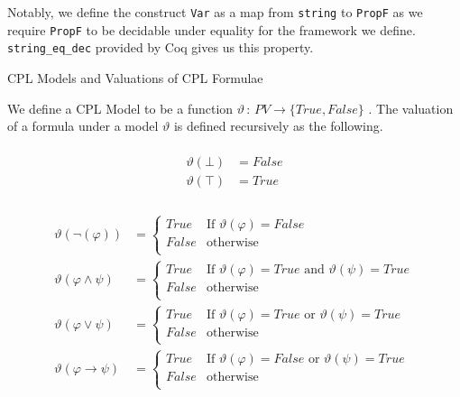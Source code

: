 \documentclass{llncs}
\begin{document}
Notably, we define the construct \verb+Var+ as a map from \verb+string+ to
\verb+PropF+ as we require \verb+PropF+ to be decidable under equality for the
framework we define. \verb+string_eq_dec+ provided by Coq gives us this
property.
%
\begin{definition}{CPL Models and Valuations of CPL Formulae}\label{CPL Model}

We define a CPL Model to be a function $\vartheta \, : \, PV \rightarrow
\{True, False\}$ \cite{kelly2009revised}. The valuation of a formula under a
model $\vartheta$ is defined recursively as the following.
%
\begin{figure}
\vspace{-2mm}
\begin{vwcol}[widths={0.25,0.75}, sep=0.5cm, justify=flush,rule=0pt,indent=1em]
\begin{align*}
\\
\vartheta (\bot) &= False \\
\vartheta (\top) &= True \\
\\
\\
\\
\end{align*}
\break
\begin{align*}
\vartheta (\neg(\varphi)) &=
\begin{cases}
True & \textrm{If } \vartheta(\varphi) = False \\
False & \textrm{otherwise} \\
\end{cases} \\
\vartheta (\varphi \wedge \psi) &=
\begin{cases}
True & \textrm{If } \vartheta(\varphi) = True \textrm{ and } \vartheta(\psi) =
True \\
False & \textrm{otherwise} \\
\end{cases} \\
\vartheta (\varphi \vee \psi) &=
\begin{cases}
True & \textrm{If } \vartheta(\varphi) = True \textrm{ or } \vartheta(\psi) =
True \\
False & \textrm{otherwise} \\
\end{cases} \\
\vartheta (\varphi \rightarrow \psi) &=
\begin{cases}
True & \textrm{If } \vartheta(\varphi) = False \textrm{ or } \vartheta(\psi) =
True \\
False & \textrm{otherwise} \\
\end{cases}
\end{align*}
\end{vwcol}
\vspace{-2mm}
\end{figure}
%
\end{definition}
\end{document}
